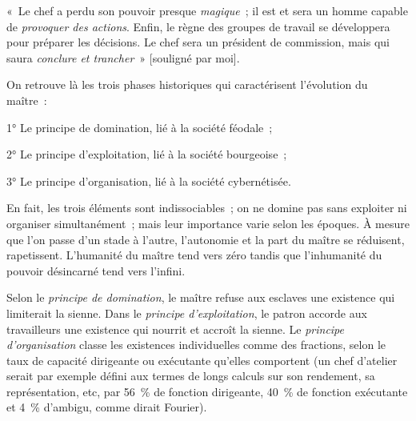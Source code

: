 \documentclass[french,twoside]{book} %
\newenvironment{quoteblock}%
  {\begin{quoting}}
  {\end{quoting}}
\newenvironment{quotebar}{%
    \def\FrameCommand{{\color{rubric!10!}\vrule width 0.5em} \hspace{0.9em}}%
    \def\OuterFrameSep{\itemsep} %
    \MakeFramed {\advance\hsize-\width \FrameRestore}
  }%
  {%
    \endMakeFramed
  }
\renewenvironment{quoteblock}%
  {%
    \savenotes
    \setstretch{0.9}
    \normalfont
    \begin{quotebar}
  }
  {%
    \end{quotebar}
    \spewnotes
  }
\begin{document}
\begin{quoteblock}
\noindent « Le chef a perdu son pouvoir presque \emph{magique} ; il est et sera un homme capable de \emph{provoquer des actions}. Enfin, le règne des groupes de travail se développera pour préparer les décisions. Le chef sera un président de commission, mais qui saura \emph{conclure et trancher} » [souligné par moi].\end{quoteblock}

\noindent On retrouve là les trois phases historiques qui caractérisent l’évolution du maître :\par
1° Le principe de domination, lié à la société féodale ;\par
2° Le principe d’exploitation, lié à la société bourgeoise ;\par
3° Le principe d’organisation, lié à la société cybernétisée.\par
En fait, les trois éléments sont indissociables ; on ne domine pas sans exploiter ni organiser simultanément ; mais leur importance varie selon les époques. À mesure que l’on passe d’un stade à l’autre, l’autonomie et la part du maître se réduisent, rapetissent. L’humanité du maître tend vers zéro tandis que l’inhumanité du pouvoir désincarné tend vers l’infini.\par
Selon le \emph{principe de domination}, le maître refuse aux esclaves une existence qui limiterait la sienne. Dans le \emph{principe d’exploitation}, le patron accorde aux travailleurs une existence qui nourrit et accroît la sienne. Le \emph{principe d’organisation} classe les existences individuelles comme des fractions, selon le taux de capacité dirigeante ou exécutante qu’elles comportent (un chef d’atelier serait par exemple défini aux termes de longs calculs sur son rendement, sa représentation, etc, par 56 \% de fonction dirigeante, 40 \% de fonction exécutante et 4 \% d’ambigu, comme dirait Fourier).\par
\end{document}
